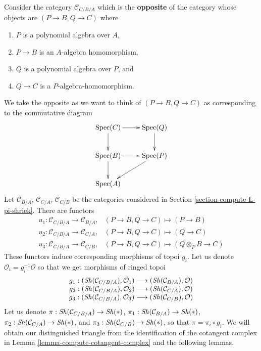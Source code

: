 \medskip\noindent
Consider the category $\mathcal{C}_{C/B/A}$
which is the {\bf opposite} of the category whose objects are
$(P \to B, Q \to C)$ where
\begin{enumerate}
\item $P$ is a polynomial algebra over $A$,
\item $P \to B$ is an $A$-algebra homomorphism,
\item $Q$ is a polynomial algebra over $P$, and
\item $Q \to C$ is a $P$-algebra-homomorphism.
\end{enumerate}
We take the opposite as we want to think of $(P \to B, Q \to C)$
as corresponding to the commutative diagram
$$
\xymatrix{
\Spec(C) \ar[d] \ar[r] & \Spec(Q) \ar[d] \\
\Spec(B) \ar[d] \ar[r] & \Spec(P) \ar[dl] \\
\Spec(A)
}
$$
Let $\mathcal{C}_{B/A}$, $\mathcal{C}_{C/A}$, $\mathcal{C}_{C/B}$
be the categories considered in Section \ref{section-compute-L-pi-shriek}.
There are functors
$$
\begin{matrix}
u_1 : \mathcal{C}_{C/B/A} \to \mathcal{C}_{B/A}, &
(P \to B, Q \to C) \mapsto (P \to B) \\
u_2 : \mathcal{C}_{C/B/A} \to \mathcal{C}_{C/A}, &
(P \to B, Q \to C) \mapsto (Q \to C) \\
u_3 : \mathcal{C}_{C/B/A} \to \mathcal{C}_{C/B}, &
(P \to B, Q \to C) \mapsto (Q \otimes_P B \to C)
\end{matrix}
$$
These functors induce corresponding morphisms of topoi $g_i$.
Let us denote $\mathcal{O}_i = g_i^{-1}\mathcal{O}$ so that we
get morphisms of ringed topoi
\begin{equation}
\label{equation-three-maps}
\begin{matrix}
g_1 : (\mathop{\mathit{Sh}}\nolimits(\mathcal{C}_{C/B/A}), \mathcal{O}_1)
\longrightarrow (\mathop{\mathit{Sh}}\nolimits(\mathcal{C}_{B/A}), \mathcal{O}) \\
g_2 : (\mathop{\mathit{Sh}}\nolimits(\mathcal{C}_{C/B/A}), \mathcal{O}_2)
\longrightarrow (\mathop{\mathit{Sh}}\nolimits(\mathcal{C}_{C/A}), \mathcal{O}) \\
g_3 : (\mathop{\mathit{Sh}}\nolimits(\mathcal{C}_{C/B/A}), \mathcal{O}_3)
\longrightarrow (\mathop{\mathit{Sh}}\nolimits(\mathcal{C}_{C/B}), \mathcal{O})
\end{matrix}
\end{equation}
Let us denote
$\pi : \mathop{\mathit{Sh}}\nolimits(\mathcal{C}_{C/B/A}) \to \mathop{\mathit{Sh}}\nolimits(*)$,
$\pi_1 : \mathop{\mathit{Sh}}\nolimits(\mathcal{C}_{B/A}) \to \mathop{\mathit{Sh}}\nolimits(*)$,
$\pi_2 : \mathop{\mathit{Sh}}\nolimits(\mathcal{C}_{C/A}) \to \mathop{\mathit{Sh}}\nolimits(*)$, and
$\pi_3 : \mathop{\mathit{Sh}}\nolimits(\mathcal{C}_{C/B}) \to \mathop{\mathit{Sh}}\nolimits(*)$,
so that $\pi = \pi_i \circ g_i$.
We will obtain our distinguished triangle from the identification
of the cotangent complex in Lemma \ref{lemma-compute-cotangent-complex}
and the following lemmas.

